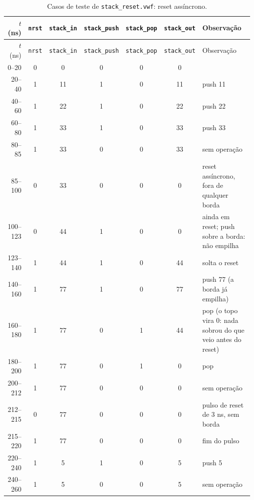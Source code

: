 {\scriptsize\setlength{\tabcolsep}{3pt}
\begin{longtable}{rcccccp{5.7cm}}
\caption{Casos de teste de \texttt{stack\_reset.vwf}: reset assíncrono.}
\label{tab:caso-stack-reset}\\
\hline $t$ (ns) & \texttt{nrst} & \texttt{stack\_in} & \texttt{stack\_push} & \texttt{stack\_pop} & \texttt{stack\_out} & Observação \\ \hline \endfirsthead
\hline $t$ (ns) & \texttt{nrst} & \texttt{stack\_in} & \texttt{stack\_push} & \texttt{stack\_pop} & \texttt{stack\_out} & Observação \\ \hline \endhead
0--20 & 0 & 0 & 0 & 0 & 0 &  \\
20--40 & 1 & 11 & 1 & 0 & 11 & push 11 \\
40--60 & 1 & 22 & 1 & 0 & 22 & push 22 \\
60--80 & 1 & 33 & 1 & 0 & 33 & push 33 \\
80--85 & 1 & 33 & 0 & 0 & 33 & sem operação \\
85--100 & 0 & 33 & 0 & 0 & 0 & reset assíncrono, fora de qualquer borda \\
100--123 & 0 & 44 & 1 & 0 & 0 & ainda em reset; push sobre a borda: não empilha \\
123--140 & 1 & 44 & 1 & 0 & 44 & solta o reset \\
140--160 & 1 & 77 & 1 & 0 & 77 & push 77 (a borda já empilha) \\
160--180 & 1 & 77 & 0 & 1 & 44 & pop (o topo vira 0: nada sobrou do que veio antes do reset) \\
180--200 & 1 & 77 & 0 & 1 & 0 & pop \\
200--212 & 1 & 77 & 0 & 0 & 0 & sem operação \\
212--215 & 0 & 77 & 0 & 0 & 0 & pulso de reset de 3 ns, sem borda \\
215--220 & 1 & 77 & 0 & 0 & 0 & fim do pulso \\
220--240 & 1 & 5 & 1 & 0 & 5 & push 5 \\
240--260 & 1 & 5 & 0 & 0 & 5 & sem operação \\
\hline
\end{longtable}}
\vspace{-0.9cm}
